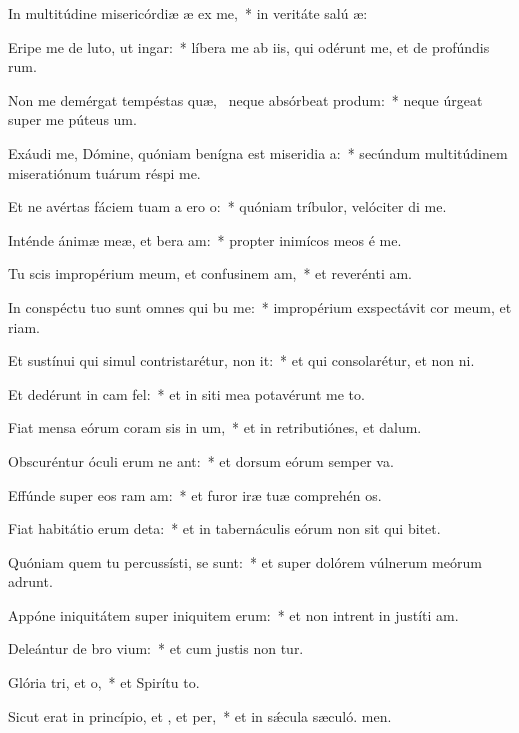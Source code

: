\item In multitúdine misericórdiæ æ ex me,~* in veritáte salú æ:
\item Eripe me de luto, ut  ingar:~* líbera me ab iis, qui odérunt me, et de profúndis rum.
\item Non me demérgat tempéstas quæ,~\pscross{} neque absórbeat  produm:~* neque úrgeat super me púteus  um.
\item Exáudi me, Dómine, quóniam benígna est miseridia a:~* secúndum multitúdinem miseratiónum tuárum réspi  me.
\item Et ne avértas fáciem tuam a ero o:~* quóniam tríbulor, velóciter di me.
\item Inténde ánimæ meæ, et bera am:~* propter inimícos meos é me.
\item Tu scis impropérium meum, et confusinem am,~* et reverénti am.
\item In conspéctu tuo sunt omnes qui bu me:~* impropérium exspectávit cor meum, et riam.
\item Et sustínui qui simul contristarétur,  non it:~* et qui consolarétur, et non ni.
\item Et dedérunt in cam  fel:~* et in siti mea potavérunt me to.
\item Fiat mensa eórum coram sis in um,~* et in retributiónes, et  dalum.
\item Obscuréntur óculi erum ne ant:~* et dorsum eórum semper va.
\item Effúnde super eos ram am:~* et furor iræ tuæ comprehén os.
\item Fiat habitátio erum deta:~* et in tabernáculis eórum non sit qui bitet.
\item Quóniam quem tu percussísti, se sunt:~* et super dolórem vúlnerum meórum adrunt.
\item Appóne iniquitátem super iniquitem erum:~* et non intrent in justíti am.
\item Deleántur de bro vium:~* et cum justis non tur.
\item Glória tri, et o,~* et Spirítu to.
\item Sicut erat in princípio, et , et per,~* et in sǽcula sæculó. men.
